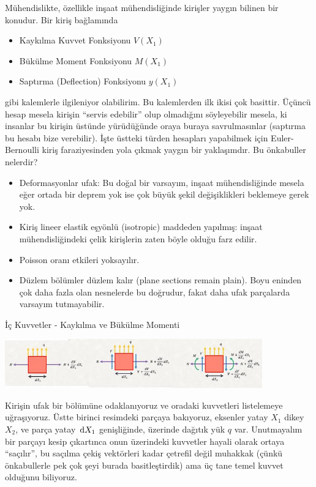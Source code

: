 \documentclass[12pt,fleqn]{article}\usepackage{../../common}
\begin{document}
Mühendislikte, özellikle inşaat mühendisliğinde kirişler yaygın bilinen
bir konudur. Bir kiriş bağlamında

\begin{itemize}
   \item Kaykılma Kuvvet Fonksiyonu $V(X_1)$
   \item Bükülme Moment Fonksiyonu $M(X_1)$
   \item Saptırma (Deflection) Fonksiyonu $y(X_1)$
\end{itemize}

gibi kalemlerle ilgileniyor olabilirim. Bu kalemlerden ilk ikisi çok basittir.
Üçüncü hesap mesela kirişin ``servis edebilir'' olup olmadığını söyleyebilir
mesela, ki insanlar bu kirişin üstünde yürüdüğünde oraya buraya savrulmasınlar
(saptırma bu hesabı bize verebilir). İşte üstteki türden hesapları yapabilmek
için Euler-Bernoulli kiriş faraziyesinden yola çıkmak yaygın bir yaklaşımdır.
Bu önkabuller nelerdir? 

\begin{itemize}
   \item Deformasyonlar ufak: Bu doğal bir varsayım, inşaat mühendisliğinde
     mesela eğer ortada bir deprem yok ise çok büyük şekil değişiklikleri
     beklemeye gerek yok. 
   \item Kiriş lineer elastik eşyönlü (isotropic) maddeden yapılmış: inşaat
     mühendisliğindeki çelik kirişlerin zaten böyle olduğu farz edilir.
   \item Poisson oranı etkileri yoksayılır.
   \item Düzlem bölümler düzlem kalır (plane sections remain plain). Boyu
     eninden çok daha fazla olan nesnelerde bu doğrudur, fakat daha ufak
     parçalarda varsayım tutmayabilir.
\end{itemize}

İç Kuvvetler - Kaykılma ve Bükülme Momenti

\includegraphics[width=30em]{phy_020_strs_02_10.jpg}

Kirişin ufak bir bölümüne odaklanıyoruz ve oradaki kuvvetleri listelemeye
uğraşıyoruz. Üstte birinci resimdeki parçaya bakıyoruz, eksenler yatay $X_1$
dikey $X_2$, ve parça yatay $\,\mathrm{d} X_1$ genişliğinde, üzerinde dağıtık yük $q$
var. Unutmayalım bir parçayı kesip çıkartınca onun üzerindeki kuvvetler hayali
olarak ortaya ``saçılır'', bu saçılma çekiş vektörleri kadar çetrefil değil
muhakkak (çünkü önkabullerle pek çok şeyi burada basitleştirdik) ama üç tane
temel kuvvet olduğunu biliyoruz.
\end{document}
